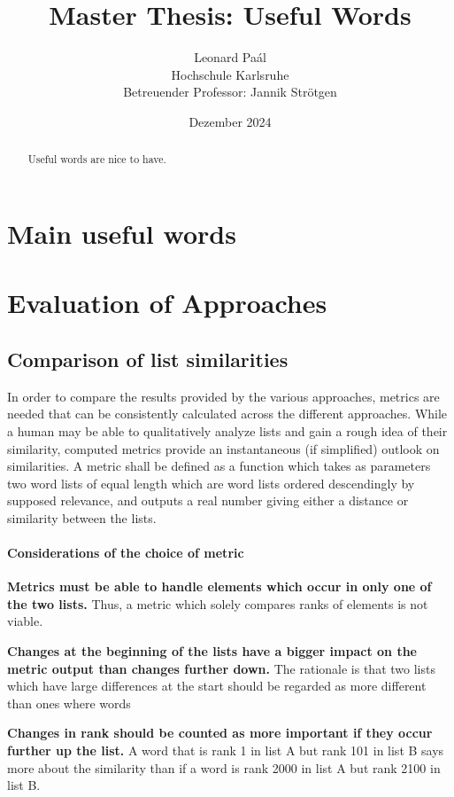 \documentclass{article}
\title{Master Thesis: Useful Words}
\author{Leonard Paál\\Hochschule Karlsruhe\\Betreuender Professor: Jannik Strötgen}
\date{Dezember 2024}
\begin{document}
\maketitle
\begin{abstract}
	\noindent Useful words are nice to have.
\end{abstract}

\clearpage
\tableofcontents
\clearpage

\section{Main useful words}
\section{Evaluation of Approaches}
\subsection{Comparison of list similarities}
In order to compare the results provided by the various approaches, metrics are needed that can be consistently calculated across the different approaches.
While a human may be able to qualitatively analyze lists and gain a rough idea of their similarity, computed metrics provide an instantaneous (if simplified) outlook on similarities.
A metric shall be defined as a function which takes as parameters two word lists of equal length which are word lists ordered descendingly by supposed relevance, and outputs a real number giving either a distance or similarity between the lists.

\paragraph{Considerations of the choice of metric}
\begin{description}
    \item  \textbf{Metrics must be able to handle elements which occur in only one of the two lists.}
        Thus, a metric which solely compares ranks of elements is not viable.
    \item  \textbf{Changes at the beginning of the lists have a bigger impact on the metric output than changes further down.}
        The rationale is that two lists which have large differences at the start should be regarded as more different than ones where words 
    \item  \textbf{Changes in rank should be counted as more important if they occur further up the list.}
        A word that is rank 1 in list A but rank 101 in list B says more about the similarity than if a word is rank 2000 in list A but rank 2100 in list B.
\end{description}
\end{document}
